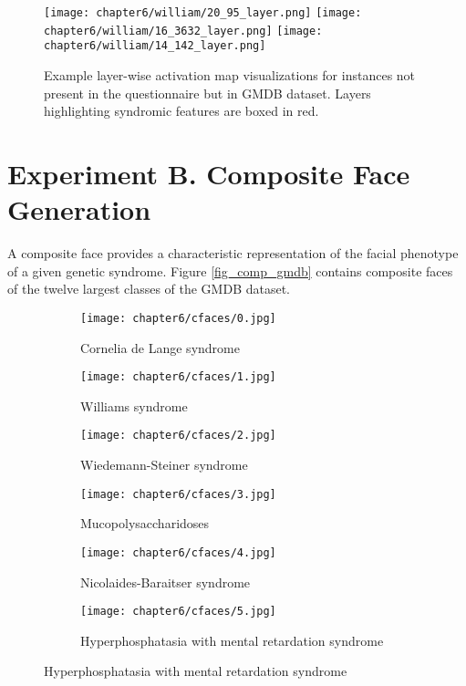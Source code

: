 \documentclass[../report.tex]{subfiles}
\begin{document}
	\begin{sidewaysfigure}
		\texttt{[image: chapter6/william/20\_95\_layer.png]}		
		\texttt{[image: chapter6/william/16\_3632\_layer.png]}
		\texttt{[image: chapter6/william/14\_142\_layer.png]}
		\caption[Example layer-wise activation map visualizations for instances not present in the questionnaire but in GMDB dataset]{Example layer-wise activation map visualizations for instances not present in the questionnaire but in GMDB dataset. Layers highlighting syndromic features are boxed in red.}
		\label{fig_layer_gmdb}
	\end{sidewaysfigure}
    \pagebreak
    
    \section{Experiment B. Composite Face Generation}
    A composite face provides a characteristic representation of the facial phenotype of a given genetic
    syndrome. Figure \ref{fig_comp_gmdb} contains composite faces of the twelve largest classes of the GMDB dataset. 
       \begin{figure}[H]
    	\begin{subfigure}[t]{0.45\textwidth}
    		\centering
    		\texttt{[image: chapter6/cfaces/0.jpg]}
    		\caption{Cornelia de Lange syndrome}    		
    	\end{subfigure}
    	\begin{subfigure}[t]{0.45\textwidth}
    		\centering
    		\texttt{[image: chapter6/cfaces/1.jpg]}
    		\caption{Williams syndrome}   		
    	\end{subfigure}
    	\begin{subfigure}[t]{0.45\textwidth}
    		\centering
    		\texttt{[image: chapter6/cfaces/2.jpg]}
    		\caption{Wiedemann-Steiner syndrome}    	
    	\end{subfigure}
    \begin{subfigure}[t]{0.45\textwidth}
    	\centering
    	\texttt{[image: chapter6/cfaces/3.jpg]}
    	\caption{Mucopolysaccharidoses}
    \end{subfigure}
	\begin{subfigure}[t]{0.45\textwidth}
		\centering
		\texttt{[image: chapter6/cfaces/4.jpg]}
		\caption{Nicolaides-Baraitser syndrome}
	\end{subfigure}
	\hspace{1.5cm}
	\begin{subfigure}[t]{0.45\textwidth}
		\centering
		\texttt{[image: chapter6/cfaces/5.jpg]}
		\caption{Hyperphosphatasia with mental retardation syndrome}
	\end{subfigure}
	\end{figure}
\end{document}
